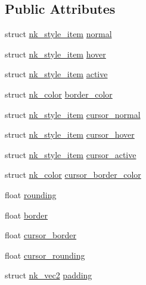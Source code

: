 \subsection*{Public Attributes}
\begin{DoxyCompactItemize}
\item 
struct \mbox{\hyperlink{structnk__style__item}{nk\+\_\+style\+\_\+item}} \mbox{\hyperlink{structnk__style__progress_a3b5e76c5d4a02397e1306a1c05db8556}{normal}}
\item 
struct \mbox{\hyperlink{structnk__style__item}{nk\+\_\+style\+\_\+item}} \mbox{\hyperlink{structnk__style__progress_ac3861da43495ae38fd6a775e68dcccd5}{hover}}
\item 
struct \mbox{\hyperlink{structnk__style__item}{nk\+\_\+style\+\_\+item}} \mbox{\hyperlink{structnk__style__progress_abb453eddb9a214da99d749f607d5623e}{active}}
\item 
struct \mbox{\hyperlink{structnk__color}{nk\+\_\+color}} \mbox{\hyperlink{structnk__style__progress_a68554aae9f9a0bd274878de0d6f7f5a2}{border\+\_\+color}}
\item 
struct \mbox{\hyperlink{structnk__style__item}{nk\+\_\+style\+\_\+item}} \mbox{\hyperlink{structnk__style__progress_a866c42112c17ee382558e69d087e1edc}{cursor\+\_\+normal}}
\item 
struct \mbox{\hyperlink{structnk__style__item}{nk\+\_\+style\+\_\+item}} \mbox{\hyperlink{structnk__style__progress_a6a7818e0712da1bee016464e555195a3}{cursor\+\_\+hover}}
\item 
struct \mbox{\hyperlink{structnk__style__item}{nk\+\_\+style\+\_\+item}} \mbox{\hyperlink{structnk__style__progress_a9c6c963356ca9e1f4b8d1defa1cd9c4c}{cursor\+\_\+active}}
\item 
struct \mbox{\hyperlink{structnk__color}{nk\+\_\+color}} \mbox{\hyperlink{structnk__style__progress_a640e304007caa59dda6661a9aa2398aa}{cursor\+\_\+border\+\_\+color}}
\item 
float \mbox{\hyperlink{structnk__style__progress_a0dc22b2561fd10a3976c11bf7bab43c2}{rounding}}
\item 
float \mbox{\hyperlink{structnk__style__progress_aca84031f1ab9dc33c61e33114927a14f}{border}}
\item 
float \mbox{\hyperlink{structnk__style__progress_a80b7c57f2bdd915e005714e797593873}{cursor\+\_\+border}}
\item 
float \mbox{\hyperlink{structnk__style__progress_aa9b02af7e3b67fc361cd367331abce93}{cursor\+\_\+rounding}}
\item 
struct \mbox{\hyperlink{structnk__vec2}{nk\+\_\+vec2}} \mbox{\hyperlink{structnk__style__progress_a9e2d973ccf1bc0a04eb426cb74e33513}{padding}}

\end{DoxyCompactItemize}
